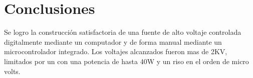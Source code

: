 \chapter{Conclusiones}
Se logro la construcción satisfactoria de una fuente de alto voltaje controlada digitalmente mediante un computador y de forma manual mediante un microcontrolador integrado. Los voltajes alcanzados fueron mas de 2KV, limitados por un con una potencia de hasta 40W y un riso en el orden de micro volts.
